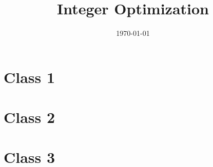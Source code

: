 \documentclass[11pt, oneside, a4paper, openany]{book}
\title{Integer Optimization}
\date{\today}
\begin{document}
\maketitle
\frontmatter

\onehalfspacing  %

\begingroup
\let\cleardoublepage\clearpage
\tableofcontents
\endgroup

\mainmatter
{}

\chapter{Class 1}


\chapter{Class 2}


\chapter{Class 3}

\end{document}
